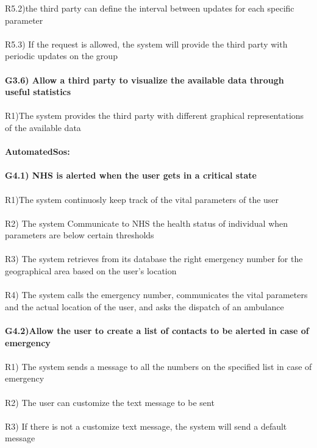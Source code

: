 R5.2)the third party can define the interval between updates for each specific parameter \\ \\
R5.3) If the request is allowed, the system will provide the third party with periodic updates on the group \\ \\ 
\textbf{G3.6) Allow a third party to visualize the available data through useful statistics} \\ \\
R1)The system provides the third party with different graphical representations of the available data \\ \\

\textbf{AutomatedSos:} \\ \\ 
\textbf{G4.1) NHS is alerted when the user gets in a critical state} \\ \\
R1)The system continuosly keep track of the vital parameters of the user \\ \\
R2) The system Communicate to NHS the health status of individual when parameters are below certain thresholds \\ \\
R3) The system retrieves from its database the right emergency number for the geographical area based on the user’s location \\ \\
R4) The system calls the emergency number, communicates the vital parameters and the actual location of the user, and asks the dispatch of an ambulance \\ \\
\textbf{G4.2)Allow the user to create a list of contacts to be alerted  in case of emergency} \\ \\
R1) The system sends a message to all the numbers on the specified list in case of emergency \\ \\
R2) The user can customize the  text message to be sent \\ \\
R3) If there is not a customize text message, the system will send a default message \\ \\

